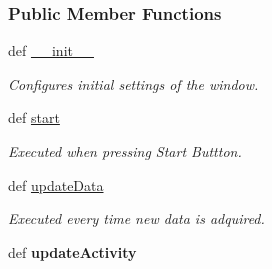 \subsubsection*{Public Member Functions}
\begin{DoxyCompactItemize}
\item 
def \hyperlink{classmain_1_1_main_window_afe60362fc3324bc53b3d0adc171cbc50}{\-\_\-\-\_\-init\-\_\-\-\_\-}
\begin{DoxyCompactList}\small\item\em Configures initial settings of the window. \end{DoxyCompactList}\item 
def \hyperlink{classmain_1_1_main_window_a2472e07b27a09bae26c1c064192cc7a0}{start}
\begin{DoxyCompactList}\small\item\em Executed when pressing Start Buttton. \end{DoxyCompactList}\item 
def \hyperlink{classmain_1_1_main_window_ac92cdbf6322bf71a1222ac4be72bb6c0}{update\-Data}
\begin{DoxyCompactList}\small\item\em Executed every time new data is adquired. \end{DoxyCompactList}\item 
\hypertarget{classmain_1_1_main_window_ae9e3c6d5509ddfa334a8c227565e6802}{def {\bfseries update\-Activity}}\label{classmain_1_1_main_window_ae9e3c6d5509ddfa334a8c227565e6802}


\end{DoxyCompactItemize}
